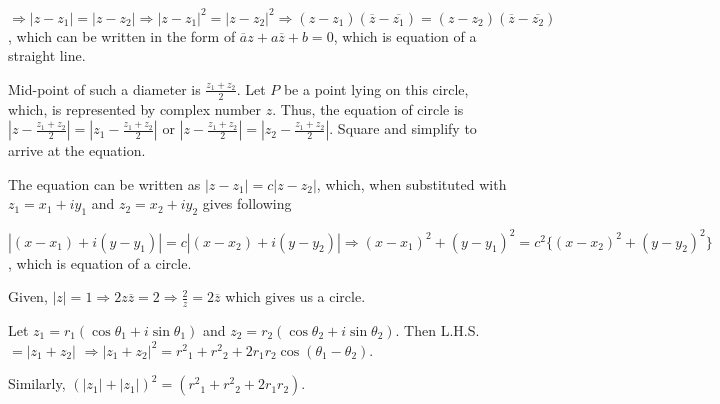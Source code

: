   $\Rightarrow |z - z_1| = |z - z_2| \Rightarrow |z - z_1|^2 = |z - z_2|^2 \Rightarrow (z -
  z_1)(\overline{z} - \overline{z_1}) = (z - z_2)(\overline{z} - \overline{z_2})$, which can be written in
  the form of $\overline{a}z + a\overline{z} + b = 0$, which is equation of a straight line.
\item Mid-point of such a diameter is $\frac{z_1 + z_2}{2}$. Let $P$ be a point lying on this circle, which,
  is represented by complex number $z$. Thus, the equation of circle is $\left|z - \frac{z_1 +
    z_2}{2}\right| = \left|z_1 - \frac{z_1 + z_2}{2}\right|$ or $\left|z - \frac{z_1 + z_2}{2}\right| =
  \left|z_2 - \frac{z_1 + z_2}{2}\right|$. Square and simplify to arrive at the equation.
\item The equation can be written as $\left|z - z_1\right| = c\left|z - z_2\right|$, which, when substituted
  with $z_1 = x_1 + iy_1$ and $z_2 = x_2 + iy_2$ gives following

  $\left|(x - x_1) + i(y - y_1)\right| = c\left|(x - x_2) + i(y - y_2)\right| \Rightarrow (x - x_1)^2 + (y -
  y_1)^2 = c^2\{(x - x_2)^2 + (y - y_2)^2\}$, which is equation of a circle.
\item Given, $|z| = 1 \Rightarrow 2z\overline{z} = 2 \Rightarrow \frac{2}{z} = 2\overline{z}$ which gives us
  a circle.
\item  Let $z_1 = r_1(\cos\theta_1 + i\sin\theta_1)$ and $z_2 = r_2(\cos\theta_2 + i\sin\theta_2)$. Then
  L.H.S. $= \left|z_1 + z_2\right|$ $\Rightarrow \left|z_1 + z_2\right|^2 = {r^2}_1 + {r^2}_2 +
  2r_1r_2\cos(\theta_1 - \theta_2)$.

  Similarly, $\left(\left|z_1\right| + \left|z_1\right|\right)^2 = \left({r^2}_1 + {r^2}_2 + 2r_1r_2\right)$.


